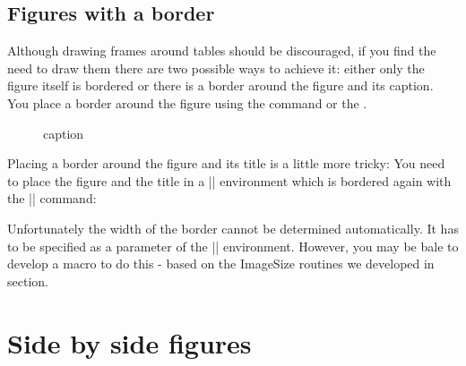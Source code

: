 \subsection{Figures with a border}

Although drawing frames around tables should be discouraged, if you find the need
to draw them there are  two possible ways to achieve it: either only the figure itself is bordered or there is a border around the figure and its caption. You place a border around the figure using the  command or the .


\begin{teX}
\begin{figure}[htbp]
  \centering
  \caption{caption}
  \label{Labelname}
\end{figure}
\end{teX}

Placing a border around the figure and its title is a little more tricky: You need to place the figure and the title in a |\minipage| environment which is bordered again with the |\fbox| command:

\begin{teX}
\begin{figure}[htbp]
  \centering
\end{figure}
\end{teX}

\begin{center}
\begin{figure}[htbp]
  \centering
\end{figure}
\end{center}


Unfortunately the width of the border cannot be determined automatically. It has to be specified as a parameter of the |\minipage| environment. However, you may be bale to develop a macro to do this - based on the ImageSize routines we developed in section.


\section{Side by side figures}

